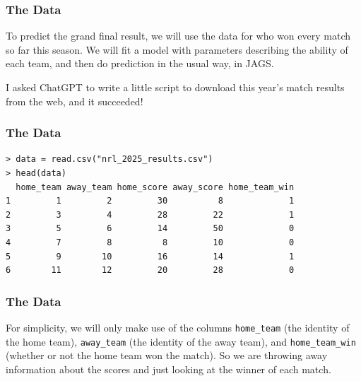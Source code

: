 \documentclass{beamer}
\begin{document}
\begin{frame}
\frametitle{The Data}
To predict the grand final result, we will use the data for who won every match
so far this season. We will fit a model with parameters describing the ability
of each team, and then do prediction in the usual way, in JAGS.\\[0.5em]\pause

I asked ChatGPT to write a little script to download this year's match results
from the web, and it succeeded!
\end{frame}


\begin{frame}[fragile]
\frametitle{The Data}

\begin{verbatim}
> data = read.csv("nrl_2025_results.csv")
> head(data)
  home_team away_team home_score away_score home_team_win
1         1         2         30          8             1
2         3         4         28         22             1
3         5         6         14         50             0
4         7         8          8         10             0
5         9        10         16         14             1
6        11        12         20         28             0
\end{verbatim}

\end{frame}


\begin{frame}[fragile]
\frametitle{The Data}
For simplicity, we will only make use of the columns
\texttt{home_team} (the identity of the home team),
\texttt{away_team} (the identity of the away team),
and \texttt{home_team_win} (whether or not the home team won the match).
So we are throwing away information about
the scores and just looking at the winner of each match.

\end{frame}
\end{document}

